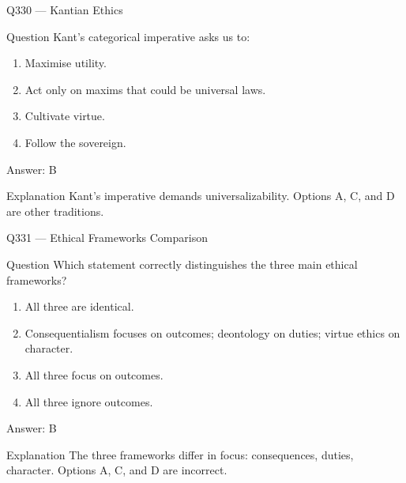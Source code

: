 \documentclass[aspectratio=169,8pt]{beamer}
\begin{document}
\begin{frame}{Q330 --- Kantian Ethics}
	\begin{block}{Question}
		Kant's categorical imperative asks us to:
		\begin{enumerate}
			\item Maximise utility.
			\item Act only on maxims that could be universal laws.
			\item Cultivate virtue.
			\item Follow the sovereign.
	\end{enumerate}  \end{block}
	\begin{exampleblock}{Answer: B}\end{exampleblock}
	\begin{block}{Explanation}
		Kant's imperative demands universalizability. Options A, C, and D are other traditions.
	\end{block}
\end{frame}

\begin{frame}{Q331 --- Ethical Frameworks Comparison}
	\begin{block}{Question}
		Which statement correctly distinguishes the three main ethical frameworks?
		\begin{enumerate}
			\item All three are identical.
			\item Consequentialism focuses on outcomes; deontology on duties; virtue ethics on character.
			\item All three focus on outcomes.
			\item All three ignore outcomes.
	\end{enumerate}  \end{block}
	\begin{exampleblock}{Answer: B}\end{exampleblock}
	\begin{block}{Explanation}
		The three frameworks differ in focus: consequences, duties, character. Options A, C, and D are incorrect.
	\end{block}
\end{frame}
\end{document}
